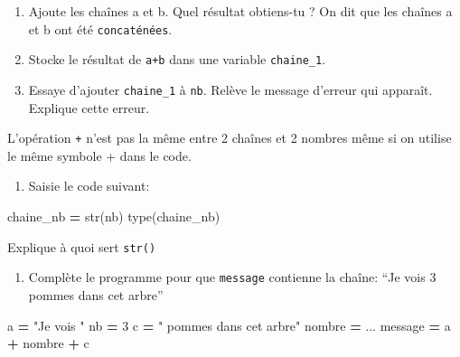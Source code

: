 \documentclass[
]{book}
\newenvironment{Shaded}{\begin{snugshade}}{\end{snugshade}}
\newcommand{\BuiltInTok}[1]{#1}
\newcommand{\DecValTok}[1]{\textcolor[rgb]{0.00,0.00,0.81}{#1}}
\newcommand{\NormalTok}[1]{#1}
\newcommand{\OperatorTok}[1]{\textcolor[rgb]{0.81,0.36,0.00}{\textbf{#1}}}
\newcommand{\StringTok}[1]{\textcolor[rgb]{0.31,0.60,0.02}{#1}}
\providecommand{\tightlist}{%
  \setlength{\itemsep}{0pt}\setlength{\parskip}{0pt}}
\def\tightlist{}
\begin{document}
\begin{enumerate}
\def\labelenumi{\arabic{enumi}.}
\setcounter{enumi}{1}
\tightlist
\item
  Ajoute les chaînes a et b. Quel résultat obtiens-tu ? On dit que les chaînes a et b ont été \texttt{concaténées}.
\item
  Stocke le résultat de \texttt{a+b} dans une variable \texttt{chaine\_1}.
\item
  Essaye d'ajouter \texttt{chaine\_1} à \texttt{nb}. Relève le message d'erreur qui apparaît. Explique cette erreur.
\end{enumerate}

L'opération \texttt{+} n'est pas la même entre 2 chaînes et 2 nombres même si on utilise le même symbole + dans le code.

\begin{enumerate}
\def\labelenumi{\arabic{enumi}.}
\setcounter{enumi}{4}
\tightlist
\item
  Saisie le code suivant:
\end{enumerate}

\begin{Shaded}
\begin{Highlighting}[]
\NormalTok{chaine\_nb }\OperatorTok{=} \BuiltInTok{str}\NormalTok{(nb)}
\BuiltInTok{type}\NormalTok{(chaine\_nb)}
\end{Highlighting}
\end{Shaded}

Explique à quoi sert \texttt{str()}

\begin{enumerate}
\def\labelenumi{\arabic{enumi}.}
\setcounter{enumi}{5}
\tightlist
\item
  Complète le programme pour que \texttt{message} contienne la chaîne: ``Je vois 3 pommes dans cet arbre''
\end{enumerate}

\begin{Shaded}
\begin{Highlighting}[]
\NormalTok{a }\OperatorTok{=} \StringTok{"Je vois "}
\NormalTok{nb }\OperatorTok{=} \DecValTok{3}
\NormalTok{c }\OperatorTok{=} \StringTok{" pommes dans cet arbre"}
\NormalTok{nombre }\OperatorTok{=}\NormalTok{ ...}
\NormalTok{message }\OperatorTok{=}\NormalTok{ a }\OperatorTok{+}\NormalTok{ nombre }\OperatorTok{+}\NormalTok{ c}
\end{Highlighting}
\end{Shaded}

\newpage
\end{document}
